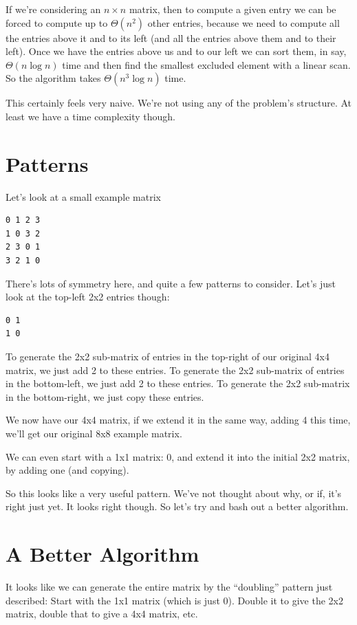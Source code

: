 \documentclass[11pt]{article}
\begin{document}
If we're considering an $n \times n$ matrix, then to compute a given entry we can be forced to compute up to $\Theta(n^2)$ other entries, because we need to compute all the entries above it and to its left (and all the entries above them and to their left). Once we have the entries above us and to our left we can sort them, in say, $\Theta(n \log n)$ time and then find the smallest excluded element with a linear scan. So the algorithm takes $\Theta(n^3 \log n)$ time.

This certainly feels very naive. We're not using any of the problem's structure. At least we have a time complexity though.

\section{Patterns}

Let's look at a small example matrix

\begin{verbatim}
0 1 2 3
1 0 3 2
2 3 0 1
3 2 1 0
\end{verbatim}

There's lots of symmetry here, and quite a few patterns to consider. Let's just look at the top-left 2x2 entries though:

\begin{verbatim}
0 1
1 0
\end{verbatim}

To generate the 2x2 sub-matrix of entries in the top-right of our original 4x4 matrix, we just add 2 to these entries. To generate the 2x2 sub-matrix of entries in the bottom-left, we just add 2 to these entries. To generate the 2x2 sub-matrix in the bottom-right, we just copy these entries.

We now have our 4x4 matrix, if we extend it in the same way, adding 4 this time, we'll get our original 8x8 example matrix.

We can even start with a 1x1 matrix: 0, and extend it into the initial 2x2 matrix, by adding one (and copying).

So this looks like a very useful pattern. We've not thought about why, or if, it's right just yet. It looks right though. So let's try and bash out a better algorithm.

\section{A Better Algorithm}

It looks like we can generate the entire matrix by the ``doubling'' pattern just described: Start with the 1x1 matrix (which is just 0). Double it to give the 2x2 matrix, double that to give a 4x4 matrix, etc.
\end{document}
